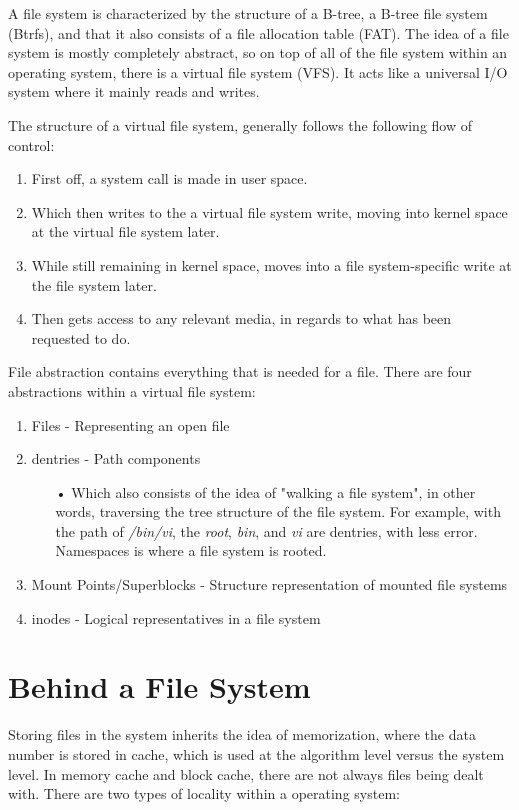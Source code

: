 \documentclass[letterpaper,10pt,onecolumn]{IEEEtran}
\begin{document}
\par
A file system is characterized by the structure of a B-tree, a B-tree file system (Btrfs), and that it also consists of a file allocation table (FAT). The idea of a file system is mostly completely abstract, so on top of all of the file system within an operating system, there is a virtual file system (VFS). It acts like a universal I/O system where it mainly reads and writes.

The structure of a virtual file system, generally follows the following flow of control: 
\begin{enumerate}
	\item First off, a system call is made in user space.
	\item Which then writes to the a virtual file system write, moving into kernel space at the virtual file system later.
	\item While still remaining in kernel space, moves into a file system-specific write at the file system later.
	\item Then gets access to any relevant media, in regards to what has been requested to do.
\end{enumerate}

\par
File abstraction contains everything that is needed for a file. There are four abstractions within a virtual file system:
\begin{enumerate}
	\item Files - Representing an open file
	\item dentries - Path components
		\begin{itemize}
			\item[•] Which also consists of the idea of "walking a file system", in other words, traversing the tree structure of the file system. For example, with the path of \textit{/bin/vi}, the \textit{root}, \textit{bin}, and \textit{vi} are dentries, with less error. Namespaces is where a file system is rooted.
		\end{itemize}
	\item Mount Points/Superblocks - Structure representation of mounted file systems
	\item inodes - Logical representatives in a file system
\end{enumerate}

\section*{Behind a File System}
\par
Storing files in the system inherits the idea of memorization, where the data number is stored in cache, which is used at the algorithm level versus the system level. In memory cache and block cache, there are not always files being dealt with. There are two types of locality within a operating system:
\end{document}
